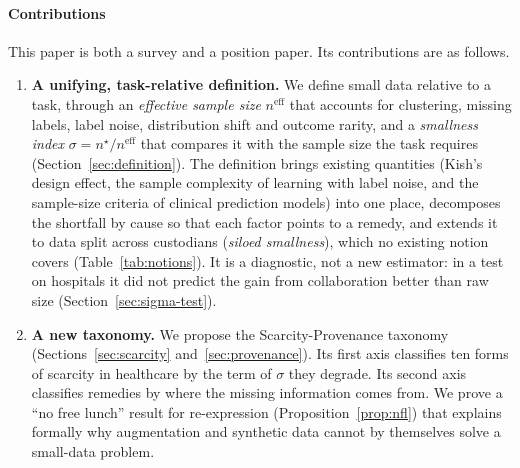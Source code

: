 \documentclass[acmsmall,screen,review]{acmart}
\newcommand{\eff}{\mathrm{eff}}
\theoremstyle{acmdefinition}
\begin{document}
\paragraph{Contributions} This paper is both a survey and a position paper. Its contributions are as follows.
\begin{enumerate}[leftmargin=*]
\item \textbf{A unifying, task-relative definition.} We define small data relative to a task, through an \emph{effective sample size} $n^{\eff}$ that accounts for clustering, missing labels, label noise, distribution shift and outcome rarity, and a \emph{smallness index} $\sigma = n^{\star}/n^{\eff}$ that compares it with the sample size the task requires (Section~\ref{sec:definition}). The definition brings existing quantities (Kish's design effect, the sample complexity of learning with label noise, and the sample-size criteria of clinical prediction models) into one place, decomposes the shortfall by cause so that each factor points to a remedy, and extends it to data split across custodians (\emph{siloed smallness}), which no existing notion covers (Table~\ref{tab:notions}). It is a diagnostic, not a new estimator: in a test on \SgHospOne{} hospitals it did not predict the gain from collaboration better than raw size (Section~\ref{sec:sigma-test}).
\item \textbf{A new taxonomy.} We propose the Scarcity-Provenance taxonomy (Sections~\ref{sec:scarcity} and~\ref{sec:provenance}). Its first axis classifies ten forms of scarcity in healthcare by the term of $\sigma$ they degrade. Its second axis classifies remedies by where the missing information comes from. We prove a ``no free lunch'' result for re-expression (Proposition~\ref{prop:nfl}) that explains formally why augmentation and synthetic data cannot by themselves solve a small-data problem.
\begin{figure}[t]
\centering
{}
\end{figure}
\end{enumerate}
\end{document}
